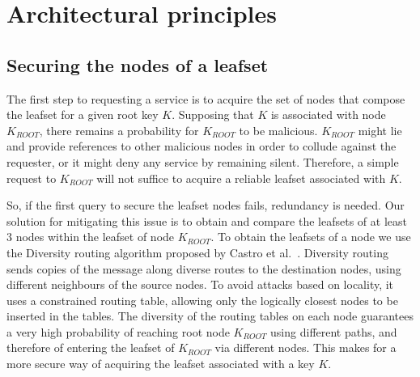 

\section{Architectural principles}

\subsection{Securing the nodes of a leafset}

The first step to requesting a service is to acquire the set of nodes that
compose the leafset for a given root key $K$. Supposing that $K$ is associated
with node $K_{ROOT}$, there remains a probability for $K_{ROOT}$ to be
malicious. $K_{ROOT}$ might lie and provide references to other malicious nodes
in order to collude against the requester, or it might deny any service by
remaining silent. Therefore, a simple request to $K_{ROOT}$ will not suffice to
acquire a reliable leafset associated with $K$.

So, if the first query to secure the leafset nodes fails, redundancy is needed.
Our solution  for mitigating this issue is to obtain and compare the leafsets
of at least 3 nodes within the leafset of node $K_{ROOT}$.
To obtain the leafsets of a node we use the Diversity routing algorithm
proposed by Castro et al.~\cite{castro2002secure}. Diversity routing sends copies of the message
along diverse routes to the destination nodes, using different
neighbours of the source nodes. To avoid attacks based on locality, it uses a
constrained routing table, allowing only the logically closest nodes to be inserted
in the tables. 
The diversity of the routing tables on each node guarantees a very high probability
of reaching root node $K_{ROOT}$ using different paths, and therefore of
entering the leafset of $K_{ROOT}$ via different nodes. This makes for a more
secure way of acquiring the leafset associated with a key $K$.



